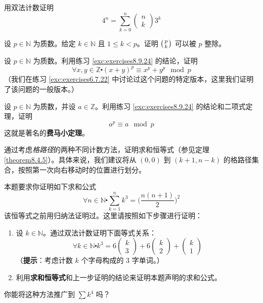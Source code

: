 \begin{exercise}
    用双法计数证明
    \[4^n = \sum_{k=0}^{n}\begin{pmatrix}n\\k\end{pmatrix}3^k\]
\end{exercise}

\begin{exercise}\label{exc:exercises8.9.24}
    设 $p \in \mathbb{N}$ 为质数。给定 $k \in \mathbb{N}$ 且 $1 \le k < p$。证明 $\big({p \atop k}\big)$ 可以被 $p$ 整除。
\end{exercise}

\begin{exercise}
    设 $p \in \mathbb{N}$ 为质数。利用练习 \ref{exc:exercises8.9.24} 的结论，证明
    \[\forall x, y \in \mathbb{Z} \centerdot (x + y)^p \equiv x^p + y^p \mod p\]
    （我们在练习 \ref{exc:exercises6.7.22} 中讨论过这个问题的特定版本，这里我们证明了该问题的一般版本。）
\end{exercise}

\begin{exercise}
    设 $p \in \mathbb{N}$ 为质数，并设 $a \in \mathbb{Z}$。利用练习 \ref{exc:exercises8.9.24} 的结论和二项式定理，证明
    \[a^p \equiv a \mod p\]
    这就是著名的\textbf{费马小定理}。
\end{exercise}

\begin{exercise}
    通过考虑\emph{格路径}的两种不同计数方法，证明求和恒等式（参见定理 \ref{theorem8.4.5}）。具体来说，我们建议将从 $(0, 0)$ 到 $(k + 1, n - k)$ 的格路径集合，按照第一次向右移动时的位置进行划分。
\end{exercise}

\begin{exercise}
    本题要求你证明如下求和公式
    \[\forall n \in \mathbb{N} \centerdot \sum_{k=1}^{n}k^3 = \Big(\frac{n(n+1)}{2}\Big)^2\]
    该恒等式之前用归纳法证明过。这里请按照如下步骤进行证明：
    \begin{enumerate}[label=(\alph*)]
        \item 设 $k \in \mathbb{N}$。通过双法计数证明下面等式关系：
              \[\forall k \in \mathbb{N} \centerdot k^3 = 6\begin{pmatrix}k\\3\end{pmatrix}+6\begin{pmatrix}k\\2\end{pmatrix}+\begin{pmatrix}k\\1\end{pmatrix}\]
              （\textbf{提示}：考虑计数 $k$ 个字母构成的 $3$ 字单词。）
        \item 利用\textbf{求和恒等式}和上一步证明的结论来证明本题声明的求和公式。
    \end{enumerate}
    你能将这种方法推广到 $\sum k^4$ 吗？
\end{exercise}

